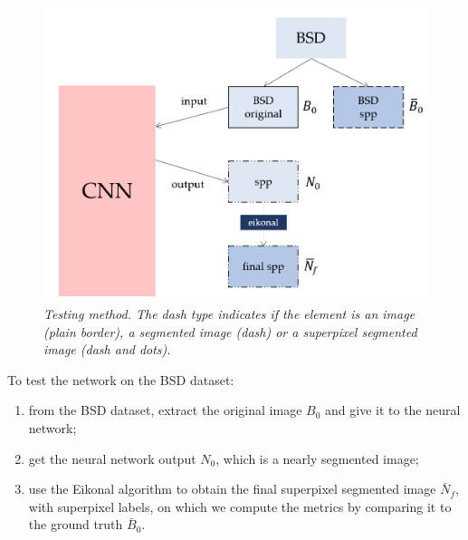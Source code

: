 \documentclass{article}
\begin{document}
        \begin{figure}[!ht]
            \centering
            \includegraphics[width=.7\linewidth]{pics/schema-test.png}
            \caption{\textit{Testing method. The dash type indicates if the element is an image (plain border), a segmented image (dash) or a superpixel segmented image (dash and dots).}}
        \end{figure}

        To test the network on the BSD dataset:
        \begin{enumerate}
            \item from the BSD dataset, extract the original image $B_0$ and give it to the neural network;
            \item get the neural network output $N_0$, which is a nearly segmented image;
            \item use the Eikonal algorithm to obtain the final superpixel segmented image $\bar N_f$, with superpixel labels, on which we compute the metrics by comparing it to the ground truth $\bar B_0$.
        \end{enumerate}
\end{document}
